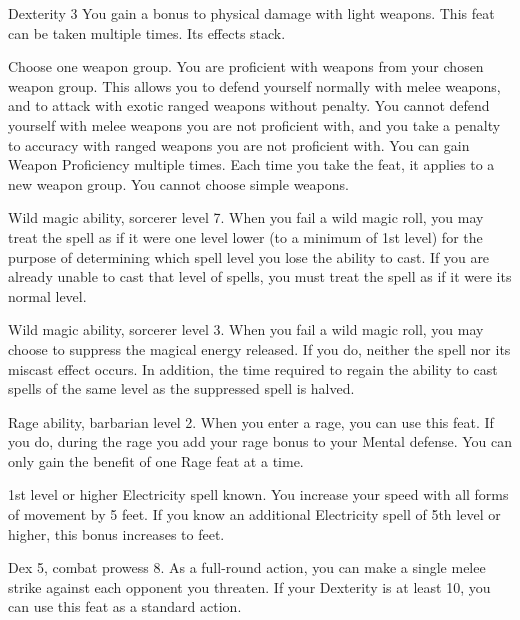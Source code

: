 \featpres Dexterity 3
\featben You gain a  bonus to physical damage with light weapons.
 This feat can be taken multiple times. Its effects stack.

Choose one weapon group.
\featben You are proficient with weapons from your chosen weapon group.
This allows you to defend yourself normally with melee weapons, and to attack with exotic ranged weapons without penalty.
You cannot defend yourself with melee weapons you are not proficient with, and you take a  penalty to accuracy with ranged weapons you are not proficient with.
You can gain Weapon Proficiency multiple times.
Each time you take the feat, it applies to a new weapon group.
You cannot choose simple weapons.

\featpre Wild magic ability, sorcerer level 7.
\featben When you fail a wild magic roll, you may treat the spell as if it were one level lower (to a minimum of 1st level) for the purpose of determining which spell level you lose the ability to cast.
If you are already unable to cast that level of spells, you must treat the spell as if it were its normal level.

\featpre Wild magic ability, sorcerer level 3.
\featben When you fail a wild magic roll, you may choose to suppress the magical energy released.
If you do, neither the spell nor its miscast effect occurs.
In addition, the time required to regain the ability to cast spells of the same level as the suppressed spell is halved.

\featpre Rage ability, barbarian level 2.
\featben When you enter a rage, you can use this feat. If you do, during the rage you add your rage bonus to your Mental defense.
 You can only gain the benefit of one Rage feat at a time.

\featpre 1st level or higher Electricity spell known.
\featben You increase your speed with all forms of movement by 5 feet.
If you know an additional Electricity spell of 5th level or higher, this bonus increases to  feet.

\featpres Dex 5, combat prowess 8.
\featben As a full-round action, you can make a single melee strike against each opponent you threaten.
If your Dexterity is at least 10, you can use this feat as a standard action.

